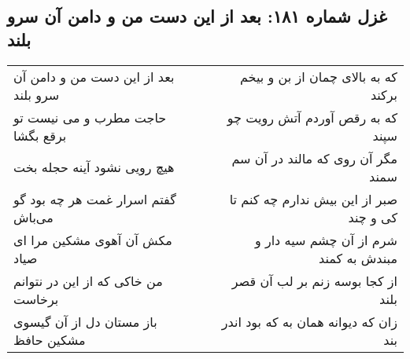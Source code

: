\begin{center}
\section*{غزل شماره ۱۸۱: بعد از این دست من و دامن آن سرو بلند}
\label{sec:sh181}
\begin{longtable}{l p{0.5cm} r}
بعد از این دست من و دامن آن سرو بلند
&&
که به بالای چمان از بن و بیخم برکند
\\
حاجت مطرب و می نیست تو برقع بگشا
&&
که به رقص آوردم آتش رویت چو سپند
\\
هیچ رویی نشود آینه حجله بخت
&&
مگر آن روی که مالند در آن سم سمند
\\
گفتم اسرار غمت هر چه بود گو می‌باش
&&
صبر از این بیش ندارم چه کنم تا کی و چند
\\
مکش آن آهوی مشکین مرا ای صیاد
&&
شرم از آن چشم سیه دار و مبندش به کمند
\\
من خاکی که از این در نتوانم برخاست
&&
از کجا بوسه زنم بر لب آن قصر بلند
\\
باز مستان دل از آن گیسوی مشکین حافظ
&&
زان که دیوانه همان به که بود اندر بند
\\
\end{longtable}
\end{center}
